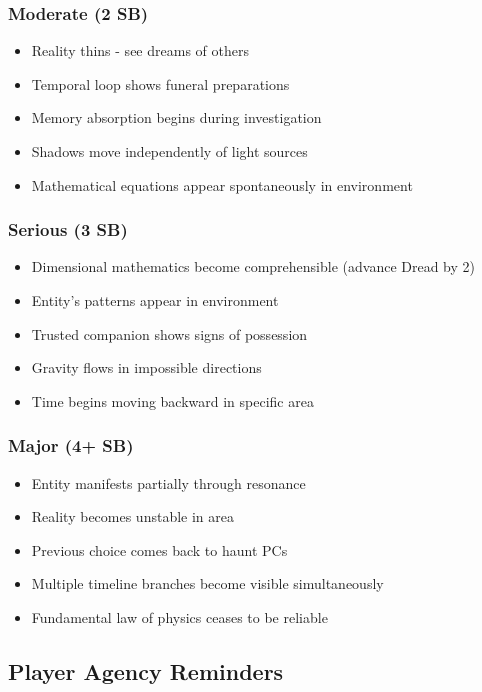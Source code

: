 \documentclass[11pt]{article}
\begin{document}
\subsubsection{Moderate (2 SB)}
\begin{itemize}
\item Reality thins - see dreams of others
\item Temporal loop shows funeral preparations
\item Memory absorption begins during investigation
\item Shadows move independently of light sources
\item Mathematical equations appear spontaneously in environment
\end{itemize}

\subsubsection{Serious (3 SB)}
\begin{itemize}
\item Dimensional mathematics become comprehensible (advance Dread by 2)
\item Entity's patterns appear in environment
\item Trusted companion shows signs of possession
\item Gravity flows in impossible directions
\item Time begins moving backward in specific area
\end{itemize}

\subsubsection{Major (4+ SB)}
\begin{itemize}
\item Entity manifests partially through resonance
\item Reality becomes unstable in area
\item Previous choice comes back to haunt PCs
\item Multiple timeline branches become visible simultaneously
\item Fundamental law of physics ceases to be reliable
\end{itemize}

\subsection{Player Agency Reminders}
\end{document}
